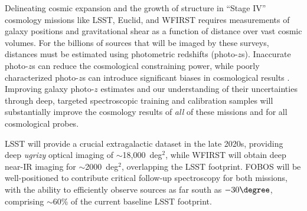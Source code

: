 \documentclass[11pt,a4paper,twoside,onecolumn,openany,final,oldfontcommands]{memoir}
\begin{document}
Delineating cosmic expansion and the growth of structure in ``Stage IV'' cosmology missions like LSST, Euclid, and WFIRST requires measurements of galaxy positions and gravitational shear as a function of distance over vast cosmic volumes. For the billions of sources that will be imaged by these surveys, distances must be estimated using photometric redshifts (photo-$z$s). Inaccurate photo-$z$s can reduce the cosmological constraining power, while poorly characterized photo-$z$s can introduce significant biases in cosmological results \citep{huterer06, LSSTDESCSRD}.  Improving galaxy photo-$z$ estimates and our understanding of their uncertainties through deep, targeted spectroscopic training and calibration samples will substantially improve the cosmology results of \emph{all} of these missions and for all cosmological probes.


LSST will provide a crucial extragalactic dataset in the late 2020s, providing deep \textit{ugrizy} optical imaging of $\sim$18,000~deg$^{2}$, while WFIRST will obtain deep near-IR imaging for $\sim$2000~deg$^{2}$, overlapping the LSST footprint. FOBOS will be well-positioned to contribute critical follow-up spectroscopy for both missions, with the ability to efficiently observe sources as far south as $-30\degree$, comprising $\sim$60\% of the current baseline LSST footprint.
\end{document}
